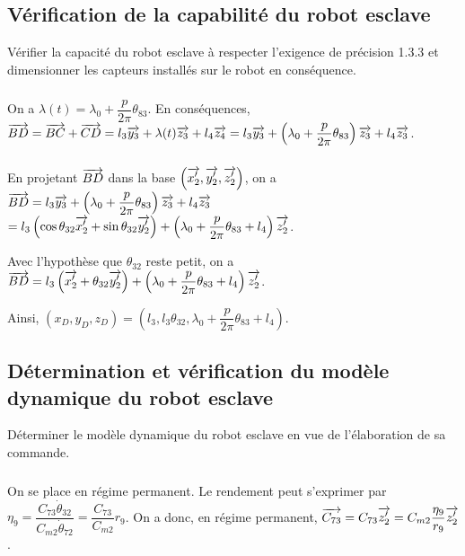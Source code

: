 \documentclass[10pt,fleqn]{article} %
\begin{document}
\subsection{Vérification de la capabilité du robot esclave}
\begin{obj}
Vérifier la capacité du robot esclave à respecter l’exigence de précision 1.3.3 et dimensionner les
capteurs installés sur le robot en conséquence.
\end{obj}


\subparagraph{}%

\subparagraph{}%
On a $\lambda(t)=\lambda_0 + \dfrac{p}{2\pi} \theta_{83}$. 
En conséquences, $\overrightarrow{BD}=\overrightarrow{BC}+\overrightarrow{CD}=l_3\overrightarrow{y_3}+\lambda(t)\overrightarrow{z_3}+l_4\overrightarrow{z_4}
=l_3\overrightarrow{y_3}+\left( \lambda_0 + \dfrac{p}{2\pi} \theta_{83} \right)\overrightarrow{z_3}+l_4\overrightarrow{z_3}$.


\subparagraph{}%
En projetant $\overrightarrow{BD}$ dans la base $\left(\overrightarrow{x_2'},\overrightarrow{y_2'},\overrightarrow{z_2'} \right)$, on a 
 $\overrightarrow{BD}=l_3\overrightarrow{y_3}+\left( \lambda_0 + \dfrac{p}{2\pi} \theta_{83} \right)\overrightarrow{z_3}+l_4\overrightarrow{z_3}$
 $ =l_3\left( \cos \theta_{32} \overrightarrow{x_2'} + \sin\theta_{32} \overrightarrow{y_2'}  \right)+\left( \lambda_0 + \dfrac{p}{2\pi} \theta_{83} +l_4\right)\overrightarrow{z_2'}$.
 
 Avec l'hypothèse que $\theta_{32}$ reste petit, on a  $\overrightarrow{BD}=l_3\left(  \overrightarrow{x_2'} + \theta_{32} \overrightarrow{y_2'}  \right)+\left( \lambda_0 + \dfrac{p}{2\pi} \theta_{83} +l_4\right)\overrightarrow{z_2'}$.
 
  Ainsi, $\left(x_D,y_D,z_D\right)=
\left( l_3,l_3 \theta_{32}, \lambda_0 + \dfrac{p}{2\pi} \theta_{83} +l_4\right)$.

\subparagraph{}%

\subsection{Détermination et vérification du modèle dynamique du robot esclave}
\begin{obj}
Déterminer le modèle dynamique du robot esclave en vue de l’élaboration de sa commande.
\end{obj}

\subparagraph{}%
On se place en régime permanent. Le rendement peut s'exprimer par 
$\eta_9 =\dfrac{C_{73}\dot{\theta}_{32}}{C_{m2}\dot{\theta}_{72}}=\dfrac{C_{73}}{C_{m2}}r_9$. 
On a donc, en régime permanent, $\overrightarrow{C_{73}}=C_{73}\overrightarrow{z'_2}=C_{m2}\dfrac{\eta_9}{r_9}\overrightarrow{z'_2}$.
\end{document}
